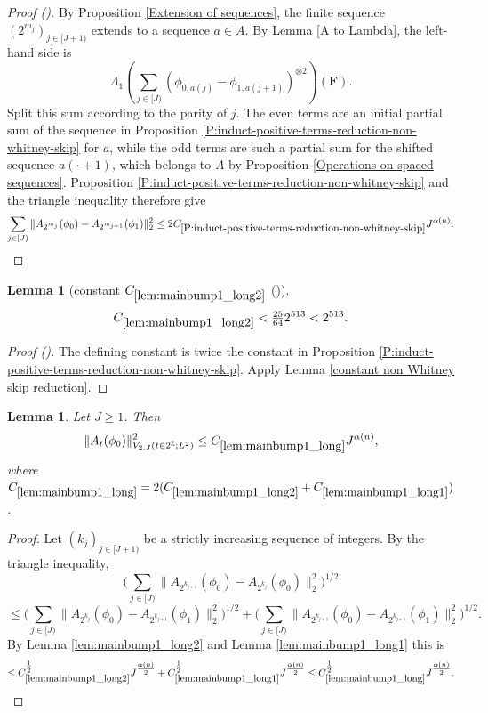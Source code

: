 \documentclass[12pt,reqno]{amsart}
\newcommand{\auto}{{({\tiny\faCar})}}
\theoremstyle{plain}
\newtheorem{lemma}[theorem]{Lemma}
\numberwithin{equation}{section}
\theoremstyle{remark}
\newcommand{\using}[1]{}
\newcommand{\F}{\mathbf{F}}
\begin{document}
\begin{proof}[Proof \auto]
By Proposition \ref{Extension of sequences}, the finite sequence $(2^{m_j})_{j\in[J+1)}$ extends to a sequence $a\in A$. By Lemma \ref{A to Lambda}, the left-hand side is
\[
\Lambda_1\left(\sum_{j\in[J)}
(\phi_{0,a(j)}-\phi_{1,a(j+1)})^{\otimes2}\right)(\F).
\]
Split this sum according to the parity of $j$. The even terms are an initial partial sum of the sequence in Proposition \ref{P:induct-positive-terms-reduction-non-whitney-skip} for $a$, while the odd terms are such a partial sum for the shifted sequence $a(\cdot+1)$, which belongs to $A$ by Proposition \ref{Operations on spaced sequences}. Proposition \ref{P:induct-positive-terms-reduction-non-whitney-skip} and the triangle inequality therefore give
\[
\sum_{j\in[J)}
\|A_{2^{m_j}}(\phi_0)-A_{2^{m_{j+1}}}(\phi_1)\|_2^2
\le2C_{\ref{P:induct-positive-terms-reduction-non-whitney-skip}}J^{\alpha(n)}.
\]
\end{proof}

\begin{lemma}[constant $C_{\ref{lem:mainbump1_long2}}$ \auto]\label{constant main bump one long two}\using{P:induct-positive-terms-reduction-non-whitney-skip}\using{constant non Whitney skip reduction}\using{lem:mainbump1_long2}
\begin{equation}\label{constant main bump one long two bound}
C_{\ref{lem:mainbump1_long2}}<\tfrac{25}{64}2^{513}<2^{513}.
\end{equation}
\end{lemma}
\begin{proof}[Proof \auto]
The defining constant is twice the constant in Proposition \ref{P:induct-positive-terms-reduction-non-whitney-skip}. Apply Lemma \ref{constant non Whitney skip reduction}.
\end{proof}

\begin{lemma}\label{lem:mainbump1_long}\using{lem:mainbump1_long2}\using{lem:mainbump1_long1}
Let $J\ge 1$. Then
\begin{equation}\label{mainbump1_long}
\|A_{t}(\phi_0)\|^2_{V_{2,J}(t\in 2^\mathbb{Z}; L^2)}  \le C_{\ref{lem:mainbump1_long}} J^{\alpha(n)},
\end{equation}
where $C_{\ref{lem:mainbump1_long}}=2(C_{\ref{lem:mainbump1_long2}} + C_{\ref{lem:mainbump1_long1}})$.
\end{lemma}

\begin{proof}
Let $(k_j)_{j\in [J+1)}$ be a strictly increasing sequence of integers.
By the triangle inequality,
\[ \Big(\sum_{j\in [J)} \|A_{2^{k_{j+1}}}(\phi_0)- A_{2^{k_j}}(\phi_0)\|_2^2\Big)^{1/2} \]
\[ \le \Big(\sum_{j\in [J)} \|A_{2^{k_{j}}}(\phi_0)- A_{2^{k_{j+1}}}(\phi_1)\|_2^2\Big)^{1/2}
+ \Big(\sum_{j\in [J)} \|A_{2^{k_{j+1}}}(\phi_0)- A_{2^{k_{j+1}}}(\phi_1)\|_2^2\Big)^{1/2}.
\]
By Lemma \ref{lem:mainbump1_long2} and Lemma \ref{lem:mainbump1_long1} this is
\[ \le C_{\ref{lem:mainbump1_long2}}^{\tfrac12} J^{\tfrac{\alpha(n)}{2}} + C_{\ref{lem:mainbump1_long1}}^{\tfrac12} J^{\tfrac{\alpha(n)}{2}} \le C_{\ref{lem:mainbump1_long}}^{\tfrac12} J^{\tfrac{\alpha(n)}{2}}.  \]
\end{proof}
\end{document}
